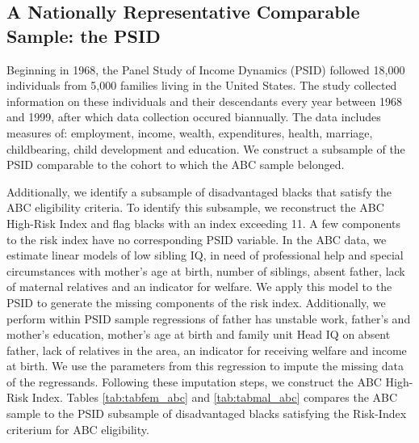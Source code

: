 \subsection{A Nationally Representative Comparable Sample: the PSID}
Beginning in 1968, the Panel Study of Income Dynamics (PSID) followed 18,000 individuals from 5,000 families living in the United States. The study collected information on these individuals and their descendants every year between 1968 and 1999, after which data collection occured biannually. The data includes measures of: employment, income, wealth, expenditures, health, marriage, childbearing, child development and education. We construct a subsample of the PSID comparable to the cohort to which the ABC sample belonged.

Additionally, we identify a subsample of disadvantaged blacks that satisfy the ABC eligibility criteria. To identify this subsample, we reconstruct the ABC High-Risk Index and flag blacks with an index exceeding 11. A few components to the risk index have no corresponding PSID variable. In the ABC data, we estimate linear models of low sibling IQ, in need of professional help and special circumstances with mother's age at birth, number of siblings, absent father, lack of maternal relatives and an indicator for welfare. We apply this model to the PSID to generate the missing components of the risk index. Additionally, we perform within PSID sample regressions of father has unstable work, father's and mother's education, mother's age at birth and family unit Head IQ on absent father, lack of relatives in the area, an indicator for receiving welfare and income at birth. We use the parameters from this regression to impute the missing data of the regressands. Following these imputation steps, we construct the ABC High-Risk Index. Tables \ref{tab:tabfem_abc} and \ref{tab:tabmal_abc} compares the ABC sample to the PSID subsample of disadvantaged blacks satisfying the Risk-Index criterium for ABC eligibility.  

